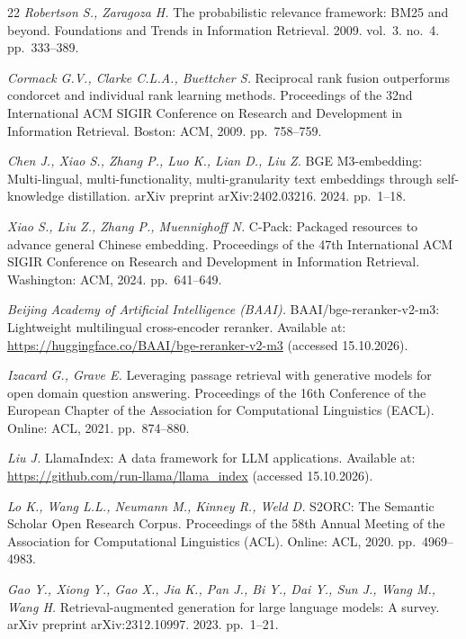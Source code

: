 \documentclass[10pt]{SPIIRAS_Proceedings}
\begin{document}
\begin{thebibliography}{22}
\emph{Robertson S., Zaragoza H.} The probabilistic relevance framework: BM25 and beyond. Foundations and Trends in Information Retrieval. 2009. vol.~3. no.~4. pp.~333--389.

\emph{Cormack G.V., Clarke C.L.A., Buettcher S.} Reciprocal rank fusion outperforms condorcet and individual rank learning methods. Proceedings of the 32nd International ACM SIGIR Conference on Research and Development in Information Retrieval. Boston: ACM, 2009. pp.~758--759.

\emph{Chen J., Xiao S., Zhang P., Luo K., Lian D., Liu Z.} BGE M3-embedding: Multi-lingual, multi-functionality, multi-granularity text embeddings through self-knowledge distillation. arXiv preprint arXiv:2402.03216. 2024. pp.~1--18.

\emph{Xiao S., Liu Z., Zhang P., Muennighoff N.} C-Pack: Packaged resources to advance general Chinese embedding. Proceedings of the 47th International ACM SIGIR Conference on Research and Development in Information Retrieval. Washington: ACM, 2024. pp.~641--649.

\emph{Beijing Academy of Artificial Intelligence (BAAI).} BAAI/bge-reranker-v2-m3: Lightweight multilingual cross-encoder reranker. Available at: \url{https://huggingface.co/BAAI/bge-reranker-v2-m3} (accessed 15.10.2026).

\emph{Izacard G., Grave E.} Leveraging passage retrieval with generative models for open domain question answering. Proceedings of the 16th Conference of the European Chapter of the Association for Computational Linguistics (EACL). Online: ACL, 2021. pp.~874--880.

\emph{Liu J.} LlamaIndex: A data framework for LLM applications. Available at: \url{https://github.com/run-llama/llama_index} (accessed 15.10.2026).

\emph{Lo K., Wang L.L., Neumann M., Kinney R., Weld D.} S2ORC: The Semantic Scholar Open Research Corpus. Proceedings of the 58th Annual Meeting of the Association for Computational Linguistics (ACL). Online: ACL, 2020. pp.~4969--4983.

\emph{Gao Y., Xiong Y., Gao X., Jia K., Pan J., Bi Y., Dai Y., Sun J., Wang M., Wang H.} Retrieval-augmented generation for large language models: A survey. arXiv preprint arXiv:2312.10997. 2023. pp.~1--21.


\end{thebibliography}
\end{document}
